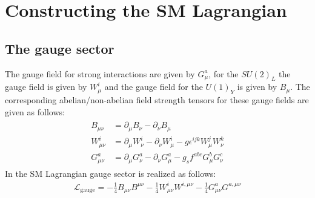 \section{Constructing the SM Lagrangian}
\subsection{The gauge sector}
The gauge field for strong interactions are given by $G_{\mu}^a$, for the $SU(2)_L$ the gauge field is given by $W_{\mu}^i$ and the gauge field for the $U(1)_Y$ is given by $B_{\mu}$. The corresponding abelian/non-abelian field strength tensors for these gauge fields are given as follows:
\begin{eqnarray}\label{GaugeFieldStreangth}
\begin{aligned} B_{\mu \nu} &=\partial_{\mu} B_{\nu}-\partial_{\nu} B_{\mu} \\ W_{\mu \nu}^{i} &=\partial_{\mu} W_{\nu}^{i}-\partial_{\nu} W_{\mu}^{i}-g \epsilon^{i j k} W_{\mu}^{j} W_{\nu}^{k} \\ G_{\mu \nu}^{a} &=\partial_{\mu} G_{\nu}^{a}-\partial_{\nu} G_{\mu}^{a}-g_{s} f^{a b c} G_{\mu}^{b} G_{\nu}^{c} \end{aligned}
\end{eqnarray}
In the SM Lagrangian gauge sector is realized as follows:
\begin{eqnarray}
\mathcal{L}_{\mathrm{gauge}}=-\frac{1}{4} B_{\mu \nu} B^{\mu \nu}-\frac{1}{4} W_{\mu \nu}^{i} W^{i, \mu \nu}-\frac{1}{4} G_{\mu \nu}^{a} G^{a, \mu \nu}
\end{eqnarray}
